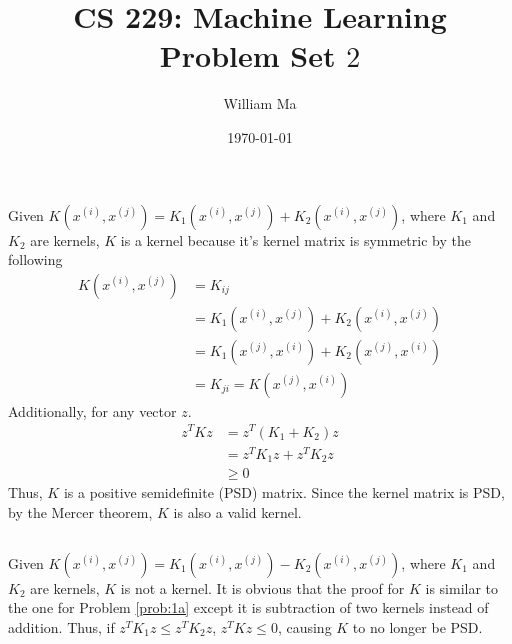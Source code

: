 \documentclass[11pt,a4paper,titlepage]{article}
\title{CS 229: Machine Learning\\
Problem Set $2$}
\author{William Ma}
\date{\today}
\begin{document}
\maketitle

\section{}{
\subsection{}{
\quad Given $K(x^{(i)}, x^{(j)}) = K_1(x^{(i)}, x^{(j)}) + K_2(x^{(i)}, x^{(j)})$, where $K_1$ and $K_2$ are kernels, $K$ is a kernel because it's kernel matrix is symmetric by the following
\begin{align*}
	K(x^{(i)}, x^{(j)}) &= K_{ij}
    \\ &= K_1(x^{(i)}, x^{(j)}) + K_2(x^{(i)}, x^{(j)})
    \\ &= K_1(x^{(j)}, x^{(i)}) + K_2(x^{(j)}, x^{(i)})
    \\ &= K_{ji} = K(x^{(j)}, x^{(i)})
\end{align*}
Additionally, for any vector $z$.
\begin{align*}
	z^TKz &= z^T(K_1+K_2)z
    \\ &= z^TK_1z + z^TK_2z
	\\ &\geq 0
\end{align*}
Thus, $K$ is a positive semidefinite (PSD) matrix. Since the kernel matrix is PSD, by the Mercer theorem, $K$ is also a valid kernel.
}\label{prob:1a}
\subsection{}{
\quad Given $K(x^{(i)}, x^{(j)}) = K_1(x^{(i)}, x^{(j)}) - K_2(x^{(i)}, x^{(j)})$, where $K_1$ and $K_2$ are kernels, $K$ is not a kernel. It is obvious that the proof for $K$ is similar to the one for Problem \ref{prob:1a} except it is subtraction of two kernels instead of addition. Thus, if $z^TK_1z \leq z^TK_2z$, $z^TKz \leq 0$, causing $K$ to no longer be PSD.
}\label{prob:1b}
}
\end{document}
